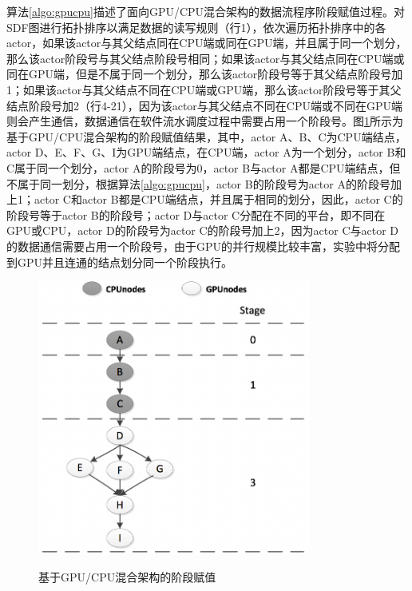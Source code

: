 算法\ref{algo:gpucpu}描述了面向GPU/CPU混合架构的数据流程序阶段赋值过程。对SDF图进行拓扑排序以满足数据的读写规则（行1），依次遍历拓扑排序中的各actor，如果该actor与其父结点同在CPU端或同在GPU端，并且属于同一个划分，那么该actor阶段号与其父结点阶段号相同；如果该actor与其父结点同在CPU端或同在GPU端，但是不属于同一个划分，那么该actor阶段号等于其父结点阶段号加1；如果该actor与其父结点不同在CPU端或GPU端，那么该actor阶段号等于其父结点阶段号加2（行4-21），因为该actor与其父结点不同在CPU端或不同在GPU端则会产生通信，数据通信在软件流水调度过程中需要占用一个阶段号。图\ref{fig:gpucpu}所示为基于GPU/CPU混合架构的阶段赋值结果，其中，actor A、B、C为CPU端结点，actor D、E、F、G、I为GPU端结点，在CPU端，actor A为一个划分，actor B和C属于同一个划分，actor A的阶段号为0，actor B与actor A都是CPU端结点，但不属于同一划分，根据算法\ref{algo:gpucpu}，actor B的阶段号为actor A的阶段号加上1；actor C和actor B都是CPU端结点，并且属于相同的划分，因此，actor C的阶段号等于actor B的阶段号；actor D与actor C分配在不同的平台，即不同在GPU或CPU，actor D的阶段号为actor C的阶段号加上2，因为actor C与actor D的数据通信需要占用一个阶段号，由于GPU的并行规模比较丰富，实验中将分配到GPU并且连通的结点划分同一个阶段执行。


\begin{figure}[htbp]
  \centering
  \includegraphics[width=0.8\textwidth]{Img/Chap_Application/Yu/gpucpu.png}\\
  \caption{基于GPU/CPU混合架构的阶段赋值}\label{fig:gpucpu}
\end{figure}

